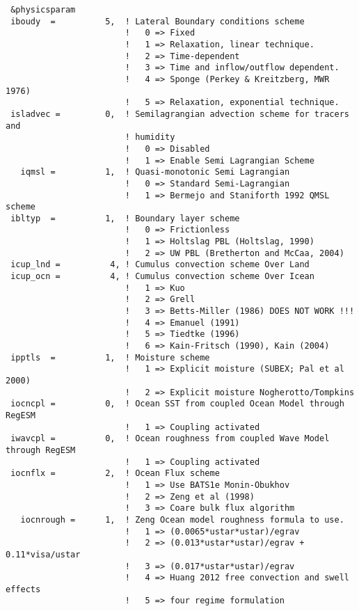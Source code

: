 {\footnotesize
\begin{Verbatim}
 &physicsparam
 iboudy  =          5,  ! Lateral Boundary conditions scheme
                        !   0 => Fixed
                        !   1 => Relaxation, linear technique.
                        !   2 => Time-dependent
                        !   3 => Time and inflow/outflow dependent.
                        !   4 => Sponge (Perkey & Kreitzberg, MWR 1976)
                        !   5 => Relaxation, exponential technique.
 isladvec =         0,  ! Semilagrangian advection scheme for tracers and
                        ! humidity
                        !   0 => Disabled
                        !   1 => Enable Semi Lagrangian Scheme
   iqmsl =          1,  ! Quasi-monotonic Semi Lagrangian
                        !   0 => Standard Semi-Lagrangian
                        !   1 => Bermejo and Staniforth 1992 QMSL scheme
 ibltyp  =          1,  ! Boundary layer scheme
                        !   0 => Frictionless
                        !   1 => Holtslag PBL (Holtslag, 1990)
                        !   2 => UW PBL (Bretherton and McCaa, 2004)
 icup_lnd =          4, ! Cumulus convection scheme Over Land
 icup_ocn =          4, ! Cumulus convection scheme Over Icean
                        !   1 => Kuo
                        !   2 => Grell
                        !   3 => Betts-Miller (1986) DOES NOT WORK !!!
                        !   4 => Emanuel (1991)
                        !   5 => Tiedtke (1996)
                        !   6 => Kain-Fritsch (1990), Kain (2004)
 ipptls  =          1,  ! Moisture scheme
                        !   1 => Explicit moisture (SUBEX; Pal et al 2000)
                        !   2 => Explicit moisture Nogherotto/Tompkins
 iocncpl =          0,  ! Ocean SST from coupled Ocean Model through RegESM
                        !   1 => Coupling activated
 iwavcpl =          0,  ! Ocean roughness from coupled Wave Model through RegESM
                        !   1 => Coupling activated
 iocnflx =          2,  ! Ocean Flux scheme
                        !   1 => Use BATS1e Monin-Obukhov
                        !   2 => Zeng et al (1998)
                        !   3 => Coare bulk flux algorithm
   iocnrough =      1,  ! Zeng Ocean model roughness formula to use.
                        !   1 => (0.0065*ustar*ustar)/egrav
                        !   2 => (0.013*ustar*ustar)/egrav + 0.11*visa/ustar
                        !   3 => (0.017*ustar*ustar)/egrav
                        !   4 => Huang 2012 free convection and swell effects
                        !   5 => four regime formulation

\end{Verbatim}}

